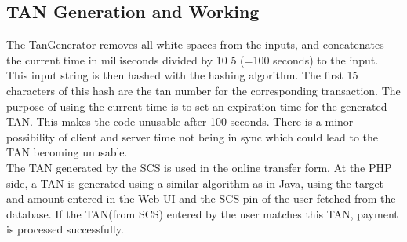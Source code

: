 \subsection{TAN Generation and Working}
The TanGenerator removes all white-spaces from the inputs, and concatenates the current time in milliseconds divided by 10 5 (=100 seconds) to the input. This input string is then hashed with the  hashing
algorithm. The first 15 characters of this hash are the tan number for the corresponding transaction.
The purpose of using the current time is to set an expiration time for the generated TAN. This makes the code unusable after 100 seconds. There is a minor possibility of client and server time not being in sync which could lead to the TAN becoming unusable. \\

The TAN generated by the SCS is used in the online transfer form. 
At the PHP side, a TAN is generated using a similar algorithm as in Java, using
the target and amount entered in the Web UI and the SCS pin of the user fetched
from the database. If the TAN(from SCS) entered by the user matches this TAN,
payment is processed successfully. \\ \\ 

